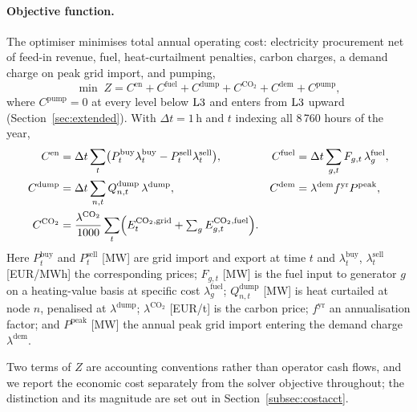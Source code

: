 \paragraph{Objective function.}
The optimiser minimises total annual operating cost: electricity procurement net of
feed-in revenue, fuel, heat-curtailment penalties, carbon charges, a demand charge on
peak grid import, and pumping,
%
\begin{equation}
  \min \; Z = C^{\mathrm{en}} + C^{\mathrm{fuel}}
    + C^{\mathrm{dump}} + C^{\mathrm{CO_2}} + C^{\mathrm{dem}}
    + C^{\mathrm{pump}},
  \label{eq:objective}
\end{equation}
%
where $C^{\mathrm{pump}} = 0$ at every level below $\mathrm{L3}$ and enters from $\mathrm{L3}$
upward (Section~\ref{sec:extended}). With $\Delta t = 1$\,h and $t$ indexing all
8\,760 hours of the year,
%
\begin{align*}
C^{\mathrm{en}}   &= \Delta t \sum_t
  \bigl(P_t^{\mathrm{buy}} \lambda_t^{\mathrm{buy}}
        - P_t^{\mathrm{sell}} \lambda_t^{\mathrm{sell}}\bigr), &
C^{\mathrm{fuel}} &= \Delta t \sum_{g,t}
  F_{g,t}\, \lambda_g^{\mathrm{fuel}}, \\
C^{\mathrm{dump}} &= \Delta t \sum_{n,t}
  Q_{n,t}^{\mathrm{dump}}\, \lambda^{\mathrm{dump}}, &
C^{\mathrm{dem}}  &= \lambda^{\mathrm{dem}} f^{\mathrm{yr}}
  P^{\mathrm{peak}}, \\
C^{\mathrm{CO_2}} &= \frac{\lambda^{\mathrm{CO_2}}}{1000} \sum_t
  \Bigl(E_t^{\mathrm{CO_2,grid}} +
        \textstyle\sum_g E_{g,t}^{\mathrm{CO_2,fuel}}\Bigr). &&
\end{align*}
%
Here $P_t^{\mathrm{buy}}$ and $P_t^{\mathrm{sell}}$ [MW] are grid import and export at
time $t$ and $\lambda_t^{\mathrm{buy}}$, $\lambda_t^{\mathrm{sell}}$ [EUR/MWh] the
corresponding prices; $F_{g,t}$ [MW] is the fuel input to generator $g$ on a
heating-value basis at specific cost $\lambda_g^{\mathrm{fuel}}$;
$Q_{n,t}^{\mathrm{dump}}$ [MW] is heat curtailed at node $n$, penalised at
$\lambda^{\mathrm{dump}}$; $\lambda^{\mathrm{CO_2}}$ [EUR/t] is the carbon price;
$f^{\mathrm{yr}}$ an annualisation factor; and $P^{\mathrm{peak}}$ [MW] the annual peak
grid import entering the demand charge $\lambda^{\mathrm{dem}}$.

Two terms of $Z$ are accounting conventions rather than operator cash flows, and we
report the economic cost separately from the solver objective throughout; the
distinction and its magnitude are set out in Section~\ref{subsec:costacct}.

